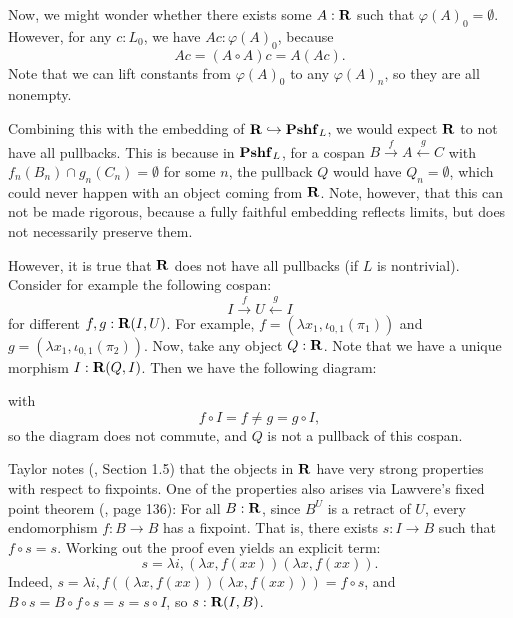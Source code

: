 Now, we might wonder whether there exists some $ A: \mathbf{R} $ such that $ \varphi(A)_0 = \emptyset $. However, for any $ c : L_0 $, we have $ A c : \varphi(A)_0 $, because
\[ A c = (A \circ A) c = A (A c). \]
Note that we can lift constants from $ \varphi(A)_0 $ to any $ \varphi(A)_n $, so they are all nonempty.

Combining this with the embedding of $ \mathbf{R} \hookrightarrow \mathbf{Pshf}_{L} $, we would expect $ \mathbf{R} $ to not have all pullbacks. This is because in $ \mathbf{Pshf}_{L} $, for a cospan $ B \xrightarrow f A \xleftarrow g C $ with $ f_n(B_n) \cap g_n(C_n) = \emptyset $ for some $ n $, the pullback $ Q $ would have $ Q_n = \emptyset $, which could never happen with an object coming from $ \mathbf{R} $. Note, however, that this can not be made rigorous, because a fully faithful embedding reflects limits, but does not necessarily preserve them.

However, it is true that $ \mathbf{R} $ does not have all pullbacks (if $ L $ is nontrivial). Consider for example the following cospan:
\[ I \xrightarrow f U \xleftarrow g I \]
for different $ f, g: \mathbf{R}(I, U) $. For example, $ f = (\lambda x_1, \iota_{0, 1}(\pi_1)) $ and $ g = (\lambda x_1, \iota_{0, 1}(\pi_2)) $. Now, take any object $ Q: \mathbf{R} $. Note that we have a unique morphism $ I: \mathbf{R}(Q, I) $. Then we have the following diagram:
\begin{center}
\end{center}
with
\[ f \circ I = f \not = g = g \circ I, \]
so the diagram does not commute, and $ Q $ is not a pullback of this cospan.

Taylor notes (\autocite{taylor}, Section 1.5) that the objects in $ \mathbf{R} $ have very strong properties with respect to fixpoints. One of the properties also arises via Lawvere's fixed point theorem (\autocite{lawvere-fixpoints}, page 136): For all $ B: \mathbf{R} $, since $ B^U $ is a retract of $ U $, every endomorphism $ f: B \to B $ has a fixpoint. That is, there exists $ s: I \to B $ such that $ f \circ s = s $. Working out the proof even yields an explicit term:
\[ s = \lambda i, (\lambda x, f (x x)) (\lambda x, f (x x)). \]
Indeed, $ s = \lambda i, f ((\lambda x, f (x x)) (\lambda x, f (x x))) = f \circ s $, and $ B \circ s = B \circ f \circ s = s = s \circ I $, so $ s : \mathbf{R}(I, B) $.

